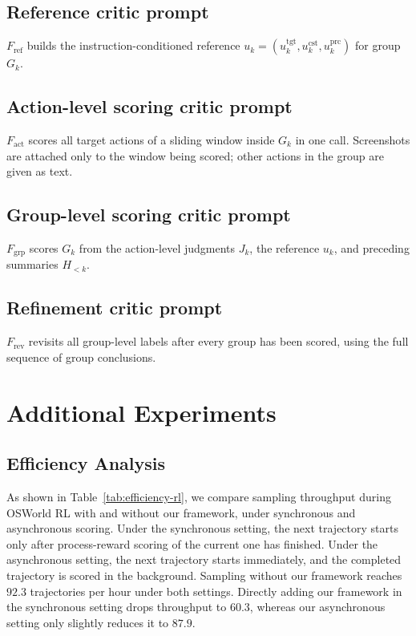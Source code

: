\subsection{Reference critic prompt}
\label{app:prompt-ref}
$F_{\mathrm{ref}}$ builds the instruction-conditioned reference $u_k=(u_k^{\mathrm{tgt}},u_k^{\mathrm{cst}},u_k^{\mathrm{prc}})$ for group $G_k$.

\subsection{Action-level scoring critic prompt}
\label{app:prompt-act}
$F_{\mathrm{act}}$ scores all target actions of a sliding window inside $G_k$ in one call.
Screenshots are attached only to the window being scored; other actions in the group are given as text.

\subsection{Group-level scoring critic prompt}
\label{app:prompt-grp}
$F_{\mathrm{grp}}$ scores $G_k$ from the action-level judgments $J_k$, the reference $u_k$, and preceding summaries $H_{<k}$.

\subsection{Refinement critic prompt}
\label{app:prompt-rev}
$F_{\mathrm{rev}}$ revisits all group-level labels after every group has been scored, using the full sequence of group conclusions.

\section{Additional Experiments}
\label{app:experiments}

\subsection{Efficiency Analysis}
\label{app:efficiency}

As shown in Table~\ref{tab:efficiency-rl}, we compare sampling throughput during OSWorld RL with and without our framework, under synchronous and asynchronous scoring. Under the synchronous setting, the next trajectory starts only after process-reward scoring of the current one has finished. Under the asynchronous setting, the next trajectory starts immediately, and the completed trajectory is scored in the background. Sampling without our framework reaches $92.3$ trajectories per hour under both settings. Directly adding our framework in the synchronous setting drops throughput to $60.3$, whereas our asynchronous setting only slightly reduces it to $87.9$.

